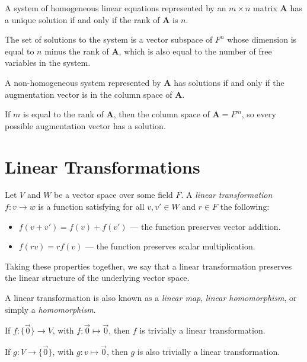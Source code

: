 \begin{rmk}
    A system of homogeneous linear equations represented by an $m \times n$ matrix $\boldsymbol{A}$ has a unique solution if and only if the rank of $\boldsymbol{A}$ is $n$.

    The set of solutions to the system is a vector subspace of $F^n$ whose dimension is equal to $n$ minus the rank of $\boldsymbol{A}$, which is also equal to the number of free variables in the system.

    A non-homogeneous system represented by $\boldsymbol{A}$ has solutions if and only if the augmentation vector is in the column space of $\boldsymbol{A}$.

    If $m$ is equal to the rank of $\boldsymbol{A}$, then the column space of $\boldsymbol{A} = F^m$, so every possible augmentation vector has a solution.
\end{rmk}

\section{Linear Transformations}

\begin{defn}\label{linear-transformation}
    Let $V$ and $W$ be a vector space over some field $F$. A \emph{linear transformation} $f: v \to w$ is a function satisfying for all $v, v' \in W$ and $r \in F$ the following:
    \begin{itemize}
        \item $f(v + v') = f(v) + f(v')$ --- the function preserves vector addition.
        \item $f(rv) = rf(v)$ --- the function preserves scalar multiplication.
    \end{itemize}
    Taking these properties together, we say that a linear transformation preserves the linear structure of the underlying vector space.

    A linear transformation is also known as a \emph{linear map}, \emph{linear homomorphism}, or simply a \emph{homomorphism}.
\end{defn}

\begin{exmp}\proofbreak
    If $f: \{\vec{0}\} \to V$, with $f: \vec{0} \mapsto \vec{0}$, then $f$ is trivially a linear transformation.

    If $g: V \to \{\vec{0}\}$, with $g: v \mapsto \vec{0}$, then $g$ is also trivially a linear transformation.
\end{exmp}

